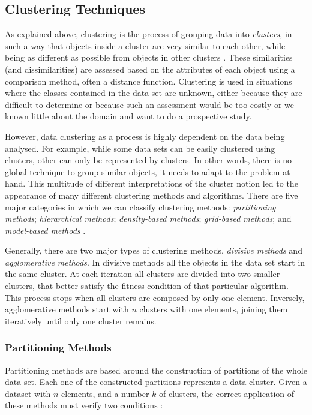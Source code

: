 \subsection{Clustering Techniques}\label{sec:clustertech}

As explained above, clustering is the process of grouping data into
\emph{clusters}, in such a way that objects inside a cluster are very similar to
each other, while being as different as possible from objects in other clusters
\cite{han2006data}. These similarities (and dissimilarities) are assessed based
on the attributes of each object using a comparison method, often a distance
function. Clustering is used in situations where the classes contained in the
data set are unknown, either because they are difficult to determine or because
such an assessment would be too costly or we known little about the domain and
want to do a prospective study.

However, data clustering as a process is highly dependent on the data being
analysed. For example, while some data sets can be easily clustered using
 clusters, other can only be represented by  clusters.
In other words, there is no global technique to group similar objects, it needs
to adapt to the problem at hand. This multitude of different interpretations of
the cluster notion led to the appearance of many different clustering methods
and algorithms. There are five major categories in which we can classify
clustering methods: \emph{partitioning methods}; \emph{hierarchical methods};
\emph{density-based methods}; \emph{grid-based methods}; and \emph{model-based
methods} \cite{han2006data}.

Generally, there are two major types of clustering methods, \emph{divisive
methods} and \emph{agglomerative methods}. In divisive methods all the objects
in the data set start in the same cluster. At each iteration all clusters are
divided into two smaller clusters, that better satisfy the fitness condition of
that particular algorithm. This process stops when all clusters are composed by
only one element. Inversely, agglomerative methods start with $n$ clusters with
one elements, joining them iteratively until only one cluster remains.

\subsubsection*{Partitioning Methods}

Partitioning methods are based around the construction of partitions of the
whole data set. Each one of the constructed partitions represents a data
cluster. Given a dataset with $n$ elements, and a number $k$ of clusters, the
correct application of these methods must verify two conditions
\cite{han2006data}:\\

